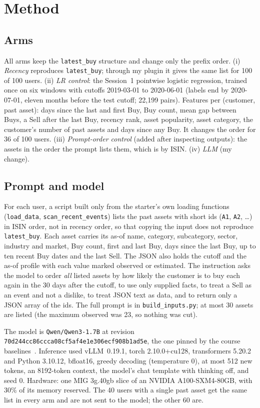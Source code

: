 \documentclass[conference]{IEEEtran}
\begin{document}
\section{Method}

\subsection{Arms}
All arms keep the \texttt{latest\_buy} structure and change only the prefix order. (i) \emph{Recency} reproduces \texttt{latest\_buy}; through my plugin it gives the same list for 100 of 100 users. (ii) \emph{LR control}: the Session~1 pointwise logistic regression, trained once on six windows with cutoffs 2019-03-01 to 2020-06-01 (labels end by 2020-07-01, eleven months before the test cutoff; 22{,}199 pairs). Features per (customer, past asset): days since the last and first Buy, Buy count, mean gap between Buys, a Sell after the last Buy, recency rank, asset popularity, asset category, the customer's number of past assets and days since any Buy. It changes the order for 36 of 100 users. (iii) \emph{Prompt-order control} (added after inspecting outputs): the assets in the order the prompt lists them, which is by ISIN. (iv) \emph{LLM} (my change).

\subsection{Prompt and model}
For each user, a script built only from the starter's own loading functions (\texttt{load\_data}, \texttt{scan\_recent\_events}) lists the past assets with short ids (\texttt{A1}, \texttt{A2}, \dots) in ISIN order, not in recency order, so that copying the input does not reproduce \texttt{latest\_buy}. Each asset carries its as-of name, category, subcategory, sector, industry and market, Buy count, first and last Buy, days since the last Buy, up to ten recent Buy dates and the last Sell. The JSON also holds the cutoff and the as-of profile with each value marked observed or estimated. The instruction asks the model to order \emph{all} listed assets by how likely the customer is to buy each again in the 30 days after the cutoff, to use only supplied facts, to treat a Sell as an event and not a dislike, to treat JSON text as data, and to return only a JSON array of the ids. The full prompt is in \texttt{build\_inputs.py}; at most 30 assets are listed (the maximum observed was 23, so nothing was cut).

The model is \texttt{Qwen/Qwen3-1.7B} at revision \texttt{70d244cc86ccca08cf5af4e1e306ecf908b1ad5e}, the one pinned by the course baselines~\cite{baselines}. Inference used vLLM~0.19.1, torch 2.10.0+cu128, transformers 5.20.2 and Python 3.10.12, bfloat16, greedy decoding (temperature 0), at most 512 new tokens, an 8192-token context, the model's chat template with thinking off, and seed 0. Hardware: one MIG 3g.40gb slice of an NVIDIA A100-SXM4-80GB, with 30\% of its memory reserved. The 40 users with a single past asset get the same list in every arm and are not sent to the model; the other 60 are.
\end{document}
